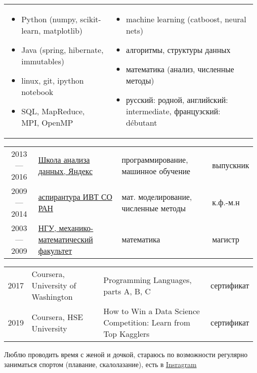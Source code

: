 \documentclass[11pt]{article}
\begin{document}
\begin{longtable} {p{}p{}}
\vspace{-2.2em}
\begin{itemize}
	\item Python (numpy, scikit-learn, matplotlib)
	\item Java (spring, hibernate, immutables)
	\item linux, git, ipython notebook
	\item SQL, MapReduce, MPI, OpenMP
\end{itemize}
&
\vspace{-2.2em}
\begin{itemize}
	\item machine learning (catboost, neural nets)
	\item алгоритмы, структуры данных
	\item математика (анализ, численные методы)
	\item русский: родной, английский: intermediate, французский: débutant
\end{itemize}
\\
\end{longtable}

\vspace{-0.5em}

\begin{longtable} {cp{}p{}l}
2013 — 2016	& \href{https://yandexdataschool.ru}{Школа анализа данных, Яндекс} & программирование, машинное обучение & выпускник \vspace{0.5em}\\
2009 — 2014	& \href{http://www.ict.nsc.ru/ru/education/postgraduate}{аспирантура ИВТ СО РАН} & мат. моделирование, численные методы & к.ф.-м.н \vspace{0.5em}\\
2003 — 2009	& \href{https://www.nsu.ru/n/mathematics-mechanics-department/}{НГУ, механико-математический факультет} & математика & магистр \vspace{0.5em}\\
\end{longtable}

\begin{longtable} {cp{}p{}l}
2017 & Coursera, University of Washington & Programming Languages, parts A, B, C & 	сертификат \vspace{0.5em}\\
2019 & Coursera, HSE University & How to Win a Data Science Competition: Learn from Top Kagglers & сертификат \vspace{0.5em}\\
\end{longtable}


\vspace{0.5em} Люблю проводить время с женой и дочкой, стараюсь по возможности регулярно заниматься спортом (плавание, скалолазание), есть в \href{https://www.instagram.com/ovalur/}{Insragram}
\end{document}
